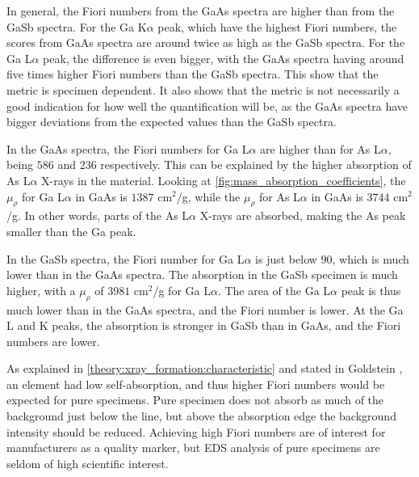 In general, the Fiori numbers from the GaAs spectra are higher than from the GaSb spectra.
For the Ga K$\alpha$ peak, which have the highest Fiori numbers, the scores from GaAs spectra are around twice as high as the GaSb spectra.
For the Ga L$\alpha$ peak, the difference is even bigger, with the GaAs spectra having around five times higher Fiori numbers than the GaSb spectra.
This show that the metric is specimen dependent.
It also shows that the metric is not necessarily a good indication for how well the quantification will be, as the GaAs spectra have bigger deviations from the expected values than the GaSb spectra.



In the GaAs spectra, the Fiori numbers for Ga L$\alpha$ are higher than for As L$\alpha$, being $586$ and $236$ respectively.
This can be explained by the higher absorption of As L$\alpha$ X-rays in the material.
Looking at \cref{fig:mass_absorption_coefficients}, the $\mu_\rho$ for Ga L$\alpha$ in GaAs is $1387$ cm$^2$/g, while the $\mu_\rho$ for As L$\alpha$ in GaAs is $3744$ cm$^2$/g.
In other words, parts of the As L$\alpha$ X-rays are absorbed, making the As peak smaller than the Ga peak.


In the GaSb spectra, the Fiori number for Ga L$\alpha$ is just below $90$, which is much lower than in the GaAs spectra.
The absorption in the GaSb specimen is much higher, with a $\mu_\rho$ of $3981$ cm$^2$/g for Ga L$\alpha$.
The area of the Ga L$\alpha$ peak is thus much lower than in the GaAs spectra, and the Fiori number is lower.
At the Ga L and K peaks, the absorption is stronger in GaSb than in GaAs, and the Fiori numbers are lower.


As explained in \cref{theory:xray_formation:characteristic} and stated in Goldstein \cite[Ch. 4.4]{goldstein_scanning_2018}, an element %
had low self-absorption, and thus higher Fiori numbers would be expected for pure specimens.
Pure specimen does not absorb as much of the background just below the line, but above the absorption edge the background intensity should be reduced.
Achieving high Fiori numbers are of interest for manufacturers as a quality marker, but EDS analysis of pure specimens are seldom of high scientific interest.


